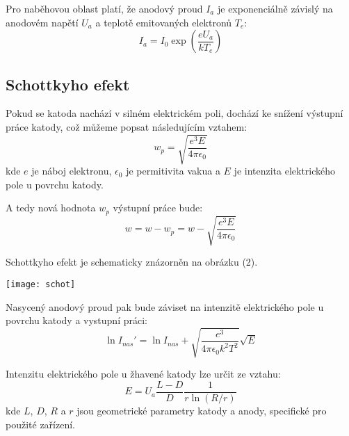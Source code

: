 \documentclass[a4paper,11pt]{article}
\begin{document}
    \begin{minipage}[t]{0.5\textwidth} 
                \par Pro naběhovou oblast platí, že anodový proud $I_a$ je exponenciálně závislý na anodovém napětí $U_a$ a teplotě emitovaných elektronů $T_e$:
                \begin{equation}
                    I_a = I_0 \exp\left(\frac{eU_a}{kT_e}\right)
                \end{equation}
            \subsection{Schottkyho efekt}
                Pokud se katoda nachází v silném elektrickém poli, dochází ke snížení výstupní práce katody, což můžeme popsat následujícím vztahem:
                \begin{equation}
                    w_p = \sqrt{\frac{e^3E}{4\pi \epsilon_0}}
                \end{equation}
                kde $e$ je náboj elektronu, $\epsilon_0$ je permitivita vakua a $E$ je intenzita elektrického pole u povrchu katody.
                \par A tedy nová hodnota $w_p$ výstupní práce bude:
                \begin{equation}
                    w = w - w_p = w - \sqrt{\frac{e^3E}{4\pi \epsilon_0}}
                \end{equation}
                \par Schottkyho efekt je schematicky znázorněn na obrázku (2).
                
                \vspace{10pt}           
                \par \centering
                \texttt{[image: schot]}
                \captionsetup{justification=centering, font=footnotesize}
                \label{fig:dif}
                \vspace{10pt}
                \raggedright 
                
                \par Nasycený anodový proud pak bude záviset na intenzitě elektrického pole u povrchu katody a vystupní práci: 
                \begin{equation}
                    \ln I_{nas}' = \ln I_{nas} + \sqrt{\frac{e^3}{4\pi \epsilon_0 k^2 T^2}} \sqrt{E}
                \end{equation}
                \par Intenzitu elektrického pole u žhavené katody lze určit ze vztahu:
                \begin{equation}
                    E = U_a \frac{L-D}{D} \frac{1}{r \ln(R/r)}
                \end{equation}
                kde $L$, $D$, $R$ a $r$ jsou geometrické parametry katody a anody, specifické pro použité zařízení.
    \end{minipage}
\end{document}
